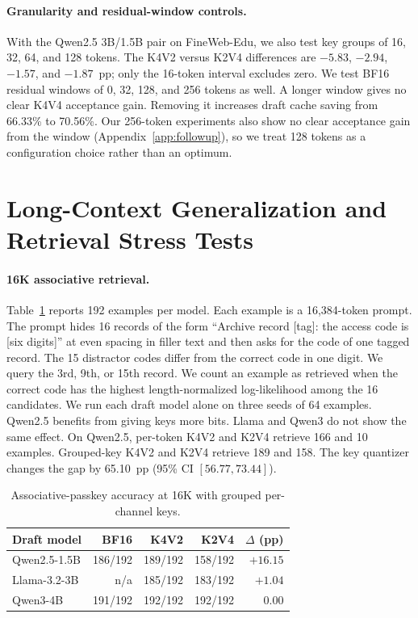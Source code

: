 \documentclass{article}
\begin{document}
\paragraph{Granularity and residual-window controls.}
With the Qwen2.5 3B/1.5B pair on FineWeb-Edu, we also test key groups of 16, 32, 64, and 128 tokens. The K4V2
versus K2V4 differences are $-5.83$, $-2.94$, $-1.57$, and $-1.87$~pp; only
the 16-token interval excludes zero. We test BF16 residual windows of 0, 32, 128, and
256 tokens as well. A longer window gives no clear K4V4 acceptance gain.
Removing it increases draft cache saving from 66.33\% to 70.56\%.
Our 256-token experiments also show no clear acceptance gain from the window
(Appendix~\ref{app:followup}), so we treat 128 tokens as a configuration
choice rather than an optimum.

\section{Long-Context Generalization and Retrieval Stress Tests}
\label{app:retrieval}

\paragraph{16K associative retrieval.}
Table~\ref{tab:app-passkey} reports 192 examples per model. Each example is a
16,384-token prompt. The prompt hides 16 records of the form ``Archive record
[tag]: the access code is [six digits]'' at even spacing in filler text and
then asks for the code of one tagged record. The 15 distractor codes differ
from the correct code in one digit. We query the 3rd, 9th, or 15th record.
We count an example as retrieved when the correct code has the highest
length-normalized log-likelihood among the 16 candidates. We run each draft
model alone on three seeds of 64 examples. Qwen2.5 benefits
from giving keys more bits. Llama and Qwen3 do not show the same effect. On
Qwen2.5, per-token K4V2 and K2V4 retrieve 166 and 10 examples. Grouped-key K4V2
and K2V4 retrieve 189 and 158. The key quantizer changes the gap by 65.10~pp
(95\% CI $[56.77,73.44]$).

\begin{table}[ht]
  \centering
  \small
  \caption{Associative-passkey accuracy at 16K with grouped per-channel keys.}
  \label{tab:app-passkey}
  \begin{tabular}{lrrrr}
    \toprule
    Draft model & BF16 & K4V2 & K2V4 & $\Delta$ (pp) \\
    \midrule
    Qwen2.5-1.5B & 186/192 & 189/192 & 158/192 & $+16.15$ \\
    Llama-3.2-3B & n/a & 185/192 & 183/192 & $+1.04$ \\
    Qwen3-4B & 191/192 & 192/192 & 192/192 & $0.00$ \\
    \bottomrule
  \end{tabular}
\end{table}
\end{document}
